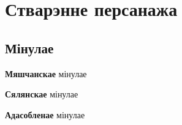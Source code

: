 \chapter*{Стварэнне персанажа}

\section*{Мінулае}

\textbf{Мяшчанскае} мінулае

\textbf{Сялянскае} мінулае

\textbf{Адасобленае} мінулае
